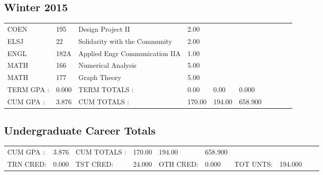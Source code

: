 \documentclass{scrartcl}\usepackage[T1]{fontenc}
\begin{document}
\subsection{Winter 2015}
\begin{tabular}{ l  l  l  l  l  l  l  l  l  l }
COEN&195&Design Project II&2.00& & & & & & \\
ELSJ&22&Solidarity with the Community&2.00& & & & & & \\
ENGL&182A&Applied Engr Communication IIA&1.00& & & & & & \\
MATH&166&Numerical Analysis&5.00& & & & & & \\
MATH&177&Graph Theory&5.00& & & & & & \\
\hline
TERM GPA :&0.000&TERM TOTALS :&0.00&0.00&0.000& & & & \\
CUM GPA :&3.876&CUM TOTALS :&170.00&194.00&658.900& & & & \\\end{tabular}
\subsection{Undergraduate Career Totals}
\begin{tabular}{ l  l  l  l  l  l  l  l  l  l }
CUM GPA :&3.876&CUM TOTALS :&170.00&194.00&658.900& & & & \\
TRN CRED:&0.000&TST CRED:&24.000&OTH CRED:&0.000&TOT UNTS:&194.000& & \\\end{tabular}
\end{document}
